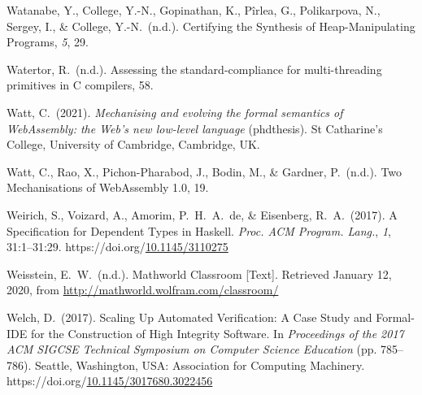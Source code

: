 \documentclass[12pt,twoside]{article}
\begin{document}
{\begin{thebibliography}{1079}
\mdbibitemlabel{}Watanabe, Y., College, Y.-N., Gopinathan, K., Pîrlea, G., Polikarpova, N., Sergey, I., \& College, Y.-N.~(n.d.). Certifying the Synthesis of Heap-Manipulating Programs, \emph{5}, 29.%

\mdbibitemlabel{}Watertor, R.~(n.d.). Assessing the standard-compliance for multi-threading primitives in C compilers, 58.%

\mdbibitemlabel{}Watt, C.~(2021). \emph{Mechanising and evolving the formal semantics of WebAssembly: the Web’s new low-level language} (phdthesis). St Catharine’s College, University of Cambridge, Cambridge, UK.%

\mdbibitemlabel{}Watt, C., Rao, X., Pichon-Pharabod, J., Bodin, M., \& Gardner, P.~(n.d.). Two Mechanisations of WebAssembly 1.0, 19.%

\mdbibitemlabel{}Weirich, S., Voizard, A., Amorim, P.~H.~A.~de, \& Eisenberg, R.~A.~(2017). A Specification for Dependent Types in Haskell. \emph{Proc. ACM Program. Lang.}, \emph{1}, 31:1–31:29. https://doi.org/\href{https://dx.doi.org/10.1145/3110275}{10.1145/3110275}%

\mdbibitemlabel{}Weisstein, E.~W.~(n.d.). Mathworld Classroom [Text]. Retrieved January 12, 2020, from \href{http://mathworld.wolfram.com/classroom/}{{\ttfamily http://\hspace{0pt}mathworld.\hspace{0pt}wolfram.\hspace{0pt}com/\hspace{0pt}classroom/\hspace{0pt}}}%

\mdbibitemlabel{}Welch, D.~(2017). Scaling Up Automated Verification: A Case Study and Formal-IDE for the Construction of High Integrity Software. In \emph{Proceedings of the 2017 ACM SIGCSE Technical Symposium on Computer Science Education} (pp. 785–786). Seattle, Washington, USA: Association for Computing Machinery. https://doi.org/\href{https://dx.doi.org/10.1145/3017680.3022456}{10.1145/3017680.3022456}%


\end{thebibliography}}
\end{document}
